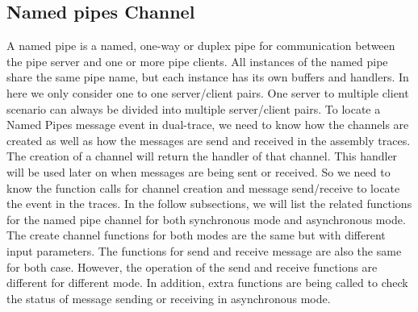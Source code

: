 \documentclass[paper=a4, fontsize=11pt]{scrartcl}
\numberwithin{equation}{section}		%
\numberwithin{figure}{section}			%
\numberwithin{table}{section}				%
\begin{document}
\subsection{Named pipes Channel}
A named pipe is a named, one-way or duplex pipe for communication between the pipe server and one or more pipe clients. All instances of the named pipe share the same pipe name, but each instance has its own buffers and handlers. In here we only consider one to one server/client pairs. One server to multiple client scenario can always be divided into multiple server/client pairs. To locate a Named Pipes message event in dual-trace, we need to know how the channels are created as well as how the messages are send and received in the assembly traces. The creation of a channel will return the handler of that channel. This handler will be used later on when messages are being sent or received. So we need to know the function calls for channel creation and message send/receive to locate the event in the traces. In the follow subsections, we will list the related functions for the named pipe channel for both synchronous mode and asynchronous mode. The create channel functions for both modes are the same but with different input parameters. The functions for send and receive message are also the same for both case. However, the operation of the send and receive functions are different for different mode. In addition, extra functions are being called to check the status of message sending or receiving in asynchronous mode.
\end{document}
